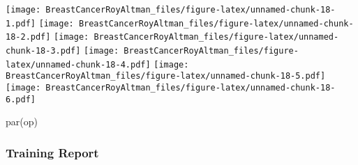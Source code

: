 \documentclass[
]{article}
\newenvironment{Shaded}{\begin{snugshade}}{\end{snugshade}}
\newcommand{\AttributeTok}[1]{\textcolor[rgb]{0.77,0.63,0.00}{#1}}
\newcommand{\ConstantTok}[1]{\textcolor[rgb]{0.00,0.00,0.00}{#1}}
\newcommand{\FloatTok}[1]{\textcolor[rgb]{0.00,0.00,0.81}{#1}}
\newcommand{\FunctionTok}[1]{\textcolor[rgb]{0.00,0.00,0.00}{#1}}
\newcommand{\NormalTok}[1]{#1}
\newcommand{\OtherTok}[1]{\textcolor[rgb]{0.56,0.35,0.01}{#1}}
\newcommand{\SpecialCharTok}[1]{\textcolor[rgb]{0.00,0.00,0.00}{#1}}
\newcommand{\StringTok}[1]{\textcolor[rgb]{0.31,0.60,0.02}{#1}}
\begin{document}
\begin{Shaded}
\end{Shaded}

\texttt{[image: BreastCancerRoyAltman\_files/figure-latex/unnamed-chunk-18-1.pdf]}
\texttt{[image: BreastCancerRoyAltman\_files/figure-latex/unnamed-chunk-18-2.pdf]}
\texttt{[image: BreastCancerRoyAltman\_files/figure-latex/unnamed-chunk-18-3.pdf]}
\texttt{[image: BreastCancerRoyAltman\_files/figure-latex/unnamed-chunk-18-4.pdf]}
\texttt{[image: BreastCancerRoyAltman\_files/figure-latex/unnamed-chunk-18-5.pdf]}
\texttt{[image: BreastCancerRoyAltman\_files/figure-latex/unnamed-chunk-18-6.pdf]}

\begin{Shaded}
\begin{Highlighting}[]
\FunctionTok{par}\NormalTok{(op)}
\end{Highlighting}
\end{Shaded}

\hypertarget{training-report}{%
\subsubsection{Training Report}\label{training-report}}

\begin{Shaded}
\end{Shaded}
\end{document}
